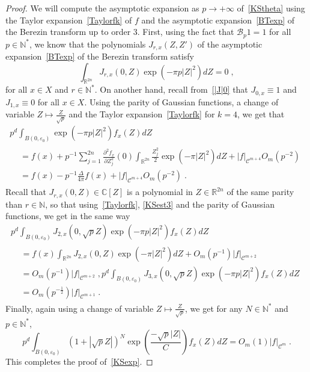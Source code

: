 \documentclass[11pt]{article}
\theoremstyle{definition}
\numberwithin{equation}{section}
\numberwithin{figure}{section}
\numberwithin{table}{section}
\newcommand{\R}{{\mathbb{R}}}
\newcommand{\N}{{\mathbb{N}}}
\newcommand{\CCC}{{\mathbb{C}}}
\newcommand{\cB}{{\mathcal{B}}}
\newcommand\< {\mathcal{h}}
\renewcommand\> {\mathcal{i}}
\renewcommand{\epsilon}{\varepsilon}
\newcommand*\cC{\mathscr{C}}
\newcommand\fl {\rightarrow}
\begin{document}
\begin{proof}
We will compute the asymptotic expansion as $p\fl+\infty$ of~\eqref{KStheta} using the Taylor expansion~\eqref{Taylorfk} of $f$ and the asymptotic expansion~\eqref{BTexp} of the Berezin transform up to order $3$. First, using the fact that $\cB_p 1=1$ for all $p\in\N^*$, we know that the polynomials $J_{r,x}(Z,Z')$ of the asymptotic expansion~\eqref{BTexp} of the Berezin transform satisfy
\begin{equation}\label{KSest3}
\int_{\R^{2n}}J_{r,x}(0,Z)\exp\left(-\pi p|Z|^2\right)dZ=0\;,
\end{equation}
for all $x\in X$ and $r\in\N^*$. On another hand, recall from~\eqref{|J|0} that $J_{0,x}\equiv 1$ and $J_{1,x}\equiv 0$ for all $x\in X$. Using the parity of Gaussian functions, a change of variable $Z\mapsto \frac{Z}{\sqrt{p}}$ and the Taylor expansion~\eqref{Taylorfk} for $k=4$, we get that
\begin{multline}\label{KSest1}
p^d\int_{B(0,\epsilon_0)}\exp\left(-\pi p|Z|^2\right)f_x(Z)dZ\\
\begin{aligned}
&=f(x) +p^{-1}\sum_{j=1}^{2n}\frac{\partial^2 f_{x}}{\partial Z^2_j}(0)
\int_{\R^{2n}}\frac{Z_j^2}{2}\exp\left(-\pi |Z|^2\right)dZ+ |f|_{\cC^{m+4}}O_m\left(p^{-2}\right)\\
&=f(x)-p^{-1}\frac{\Delta}{4\pi}f(x)+|f|_{\cC^{m+4}}O_m\left(p^{-2}\right)\;.
\end{aligned}
\end{multline}
Recall that $J_{r,x}(0,Z)\in\CCC[Z]$ is a polynomial in $Z\in\R^{2n}$ of the same parity than $r\in\N$, so that using~\eqref{Taylorfk}, \eqref{KSest3} and the parity of Gaussian functions, we get in the same way
\begin{multline}\label{KSest2}
p^d\int_{B(0,\epsilon_0)} J_{2,x}(0,\sqrt{p}Z) \exp\left(-\pi p|Z|^2\right)f_x(Z)dZ\\
\begin{aligned}
&=f(x)\int_{\R^{2n}}J_{2,x}(0,Z)\exp\left(-\pi|Z|^2\right)dZ+O_m(p^{-1}) |f|_{\cC^{m+2}}\\
&=O_m\left(p^{-1}\right)|f|_{\cC^{m+2}}\;,
p^d\int_{B(0,\epsilon_0)} J_{3,x}(0,\sqrt{p}Z) \exp\left(-\pi p|Z|^2\right)f_x(Z)dZ\\
&=O_m\left(p^{-\frac{1}{2}}\right)|f|_{\cC^{m+1}}\;.
\end{aligned}
\end{multline}
Finally, again using a change of variable $Z\mapsto \frac{Z}{\sqrt{p}}$, we get for any $N\in\N^*$ and $p\in\N^*$,
\begin{equation}\label{KSest4}
p^d\int_{B(0,\epsilon_0)}(1+|\sqrt{p}Z|)^N\exp\left(\frac{-\sqrt{p}|Z|}{C}\right)f_x(Z)dZ =O_m(1)|f|_{\cC^m}\;.
\end{equation}
This completes the proof of~\eqref{KSexp}.
\end{proof}
\end{document}
